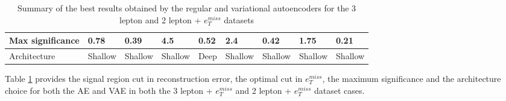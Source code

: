 \begin{table}[!htb]
\begin{tabular}{l|llll|llll|}
    \multicolumn{1}{|l|}{Max significance}                                                       & \multicolumn{1}{l|}{0.78}            & \multicolumn{1}{l|}{0.39}            & \multicolumn{1}{l|}{4.5}             &        \multicolumn{1}{l|}{0.52}              & \multicolumn{1}{l|}{2.4}            & \multicolumn{1}{l|}{0.42}            & \multicolumn{1}{l|}{1.75}             &    \multicolumn{1}{l|}{0.21}             \\ \hline
    \multicolumn{1}{|l|}{Architecture}                                                           & \multicolumn{1}{l|}{Shallow}            & \multicolumn{1}{l|}{Shallow}            & \multicolumn{1}{l|}{Shallow}             &        \multicolumn{1}{l|}{Deep}     & \multicolumn{1}{l|}{Shallow}     & \multicolumn{1}{l|}{Shallow}            & \multicolumn{1}{l|}{Shallow}             &    \multicolumn{1}{l|}{Shallow}             \\ \hline
    \end{tabular}
    \caption[Executive summary table]{Summary of the best results obtained by the regular and variational autoencoders for the 3 lepton and 2 lepton + $e_T^{miss}$ datasets}
    \label{tab:exec_summary}
\end{table}
Table \ref{tab:exec_summary} provides the signal region cut in reconstruction error, the optimal cut in $e_T^{miss}$, the maximum significance and the architecture choice
for both the AE and VAE in both the 3 lepton + $e_T^{miss}$ and 2 lepton + $e_T^{miss}$ dataset cases. 


